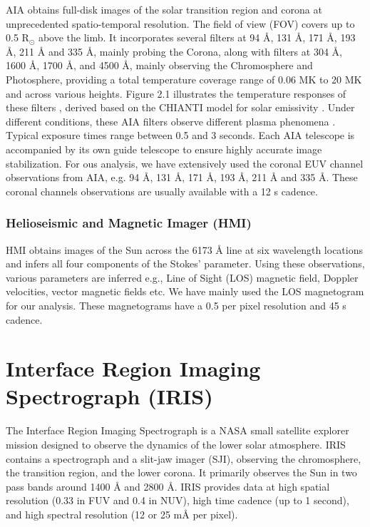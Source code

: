 AIA \citep{aia} obtains full-disk images of the solar transition region and corona at unprecedented spatio-temporal resolution. The field of view (FOV) covers up to 0.5 $\mathrm{R_{\odot}}$ above the limb. It incorporates several filters at 94 {\AA}, 131 {\AA}, 171 {\AA}, 193 {\AA}, 211 {\AA} and 335 {\AA}, mainly probing the Corona, along with filters at 304 {\AA}, 1600 {\AA}, 1700 {\AA}, and 4500 {\AA}, mainly observing the Chromosphere and Photosphere, providing a total temperature coverage range of 0.06 MK to 20 MK and across various heights. Figure 2.1 illustrates the temperature responses of these filters \citep{borner12}, derived based on the CHIANTI model for solar emissivity \citep{chianti,chianti1}. Under different conditions, these AIA filters observe different plasma phenomena \citep{o'dwyer10}. Typical exposure times range between 0.5 and 3 seconds. Each AIA telescope is accompanied by its own guide telescope to ensure highly accurate image stabilization. For ous analysis, we have extensively used the coronal EUV channel observations from AIA, e.g. 94 {\AA}, 131 {\AA}, 171 {\AA}, 193 {\AA}, 211 {\AA} and 335 {\AA}. These coronal channels observations are usually available with a 12 s cadence.

\subsubsection{Helioseismic and Magnetic Imager (HMI)}

HMI \citep{hmi} obtains images of the Sun across the  6173 {\AA} line at six wavelength locations and infers all four components of the Stokes' parameter. Using these observations, various parameters are inferred e.g., Line of Sight (LOS) magnetic field, Doppler velocities, vector magnetic fields etc. We have mainly used the LOS magnetogram for our analysis. These magnetograms have a 0.5{\arcsec} per pixel resolution and 45 s cadence.

\section{Interface Region Imaging Spectrograph (IRIS)}

The Interface Region Imaging Spectrograph \citep[IRIS;][]{iris} is a NASA small satellite explorer mission designed to observe the dynamics of the lower solar atmosphere. IRIS contains a spectrograph and a slit-jaw imager (SJI), observing the chromosphere, the transition region, and the lower corona. It primarily observes the Sun in two pass bands around 1400 {\AA} and 2800 {\AA}. IRIS provides data at high spatial resolution (0.33 {\arcsec} in FUV and 0.4 {\arcsec} in NUV), high time cadence (up to 1 second), and high spectral resolution (12 or 25 m{\AA} per pixel).


